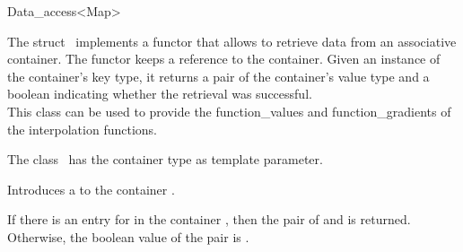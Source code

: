 \begin{ccRefClass}{Data_access<Map>}  %

\ccDefinition
  
The struct \ccRefName\ implements a functor that allows to retrieve
data from an associative container. The functor keeps a reference to
the container. Given an instance of the container's key type, it
returns a pair of the container's value type and a boolean indicating
whether the retrieval was successful.\\

This class can be used to provide the function\_values and
function\_gradients of the interpolation functions.


\ccParameters The class
\ccRefName\ has the container type  as template parameter.

\ccTypes 
{}
\ccGlue
{}
\ccCreation
{}  %
{Introduces a  to the container .}


 {If
  there is an entry for  in the container , then the
  pair of  and  is returned. Otherwise, the
  boolean value of the pair is .}

\end{ccRefClass}


